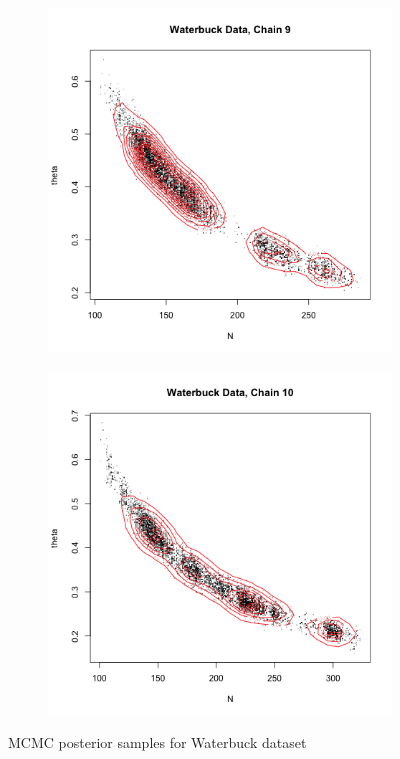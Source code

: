 \documentclass[10pt,psamsfonts]{amsart}
\theoremstyle{definition}
\theoremstyle{remark}
\numberwithin{equation}{section}
\begin{document}
\begin{figure}
\begin{subfigure}[b]{0.3\textwidth}
	\end{subfigure}
	\begin{subfigure}[b]{0.3\textwidth}
		\includegraphics[width=\textwidth]{wonlee_mcmc_waterbuck_9.png}
	\end{subfigure}
	\begin{subfigure}[b]{0.3\textwidth}
		\includegraphics[width=\textwidth]{wonlee_mcmc_waterbuck_10.png}
	\end{subfigure}
	\caption{MCMC posterior samples for Waterbuck dataset}
\end{figure}
\end{document}
